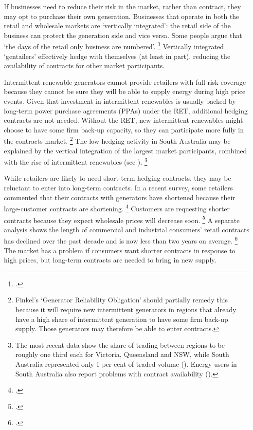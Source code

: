 \documentclass[FrontPage]{grattan}
\begin{document}
If businesses need to reduce their risk in the market, rather than contract, they may opt to purchase their own generation. Businesses that operate in both the retail and wholesale markets are `vertically integrated': the retail side of the business can protect the generation side and vice versa. Some people argue that `the days of the retail only business are numbered'.%
\footcites{Potter2017Powershop}{Simshauser2017IntermittentGeneration} 
Vertically integrated `gentailers' effectively hedge with themselves (at least in part), reducing the availability of contracts for other market participants. 

Intermittent renewable generators cannot provide retailers with full risk coverage because they cannot be sure they will be able to supply energy during high price events. Given that investment in intermittent renewables is usually backed by long-term power purchase agreements (PPAs) under the RET, additional hedging contracts are not needed. Without the RET, new intermittent renewables might choose to have some firm back-up capacity, so they can participate more fully in the contracts market.%
\footnote{Finkel's `Generator Reliability Obligation' should partially remedy this because it will require new intermittent generators in regions that already have a high share of intermittent generation to have some firm back-up supply. Those generators may therefore be able to enter contracts.} 
The low hedging activity in South Australia may be explained by the vertical integration of the largest market participants, combined with the rise of intermittent renewables (see ).%
\footnote{The most recent data show the share of trading between regions to be roughly one third each for Victoria, Queensland and NSW, while South Australia represented only 1 per cent of traded volume (\textcite[][13]{AFMA2016AFMR}). Energy users in South Australia also report problems with contract availability (\textcite[][81]{Finkel2017ReviewFinal}).}

While retailers are likely to need short-term hedging contracts, they may be reluctant to enter into long-term contracts. In a recent survey, some retailers commented that their contracts with generators have shortened because their large-customer contracts are shortening.%
\footcite[][60]{AEMC2017RetailCompReview}
Customers are requesting shorter contracts because they expect wholesale prices will decrease soon.%
\footcite[][60]{AEMC2017RetailCompReview}
A separate analysis shows the length of commercial and industrial consumers' retail contracts has declined over the past decade and is now less than two years on average.%
\footcite{Simshauser2017IntermittentGeneration}
The market has a problem if consumers want shorter contracts in response to high prices, but long-term contracts are needed to bring in new supply.
\end{document}
